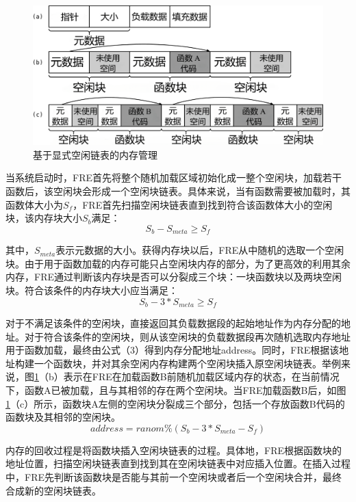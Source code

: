 \documentclass[UTF8,12pt,a4paper]{ctexart}
\numberwithin{figure}{section}
\begin{document}
\begin{figure}[H]
    \centering
    \includegraphics[scale=0.23]{graph/memoryManagement.png}
    \caption{基于显式空闲链表的内存管理}
    \label{fig:memoryManagement}
\end{figure}
\par 当系统启动时，FRE首先将整个随机加载区域初始化成一整个空闲块，加载若干函数后，该空闲块会形成一个空闲块链表。具体来说，当有函数需要被加载时，其函数体大小为$S_f$​，FRE首先扫描空闲块链表直到找到符合该函数体大小的空闲块，该内存块大小$S_b$​满足：
\begin{equation}
    S_b-S_{meta}≥S_f \label{1}
\end{equation}
\par 其中，$S_{meta}$表示元数据的大小。获得内存块以后，FRE从中随机的选取一个空闲块。由于用于函数加载的内存可能只占空闲块内存的部分，为了更高效的利用其余内存，FRE通过判断该内存块是否可以分裂成三个块：一块函数块以及两块空闲块。符合该条件的内存块大小应当满足：
\begin{equation}
    S_b-3*S_{meta}≥S_f
\end{equation}
\par 对于不满足该条件的空闲块，直接返回其负载数据段的起始地址作为内存分配的地址。对于符合该条件的空闲块，则从该空闲块的负载数据段再次随机选取内存地址用于函数加载，最终由公式（3）得到内存分配地址address。同时，FRE根据该地址构建一个函数块，并对其余空闲内存构建两个空闲块插入原空闲块链表。举例来说，图\ref{fig:memoryManagement}（b）表示在FRE在加载函数B前随机加载区域内存的状态，在当前情况下，函数A已被加载，且与其相邻的存在两个空闲块。当FRE加载函数B后，如图\ref{fig:memoryManagement}（c）所示，函数块A左侧的空闲块分裂成三个部分，包括一个存放函数B代码的函数块及其相邻的空闲块。
\begin{equation}
    address=ranom\%(S_b-3*S_{meta}-S_f)
\end{equation}
\par 内存的回收过程是将函数块插入空闲块链表的过程。具体地，FRE根据函数块的地址位置，扫描空闲块链表直到找到其在空闲块链表中对应插入位置。在插入过程中，FRE先判断该函数块是否能与其前一个空闲块或者后一个空闲块合并，最终合成新的空闲块链表。
\end{document}
